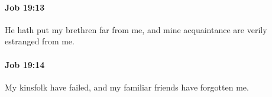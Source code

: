 		\paragraph{Job 19:13} %
			\label{JOB-19-13}

			He hath put my brethren far from me, and mine acquaintance are verily estranged from me.


		\paragraph{Job 19:14} %
			\label{JOB-19-14}

			My kinsfolk have failed, and my familiar friends have forgotten me.


